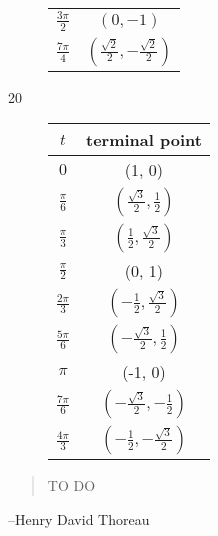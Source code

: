 \documentclass{exam}
\begin{document}
\begin{description}
\begin{tabular}{cc}
          $\frac{3 \pi}{2}$ & $\left( 0, -1 \right)$ \\
          $\frac{7 \pi}{4}$ & $\left( \frac{\sqrt{2}}{2}, -\frac{\sqrt{2}}{2} \right)$ \\
          \bottomrule
        \end{tabular}

      \item[20]
        \begin{tabular}{cc}
          \toprule
          $t$ & terminal point \\
          \midrule
          $0$ & (1, 0) \\
          $\frac{\pi}{6}$ & $\left( \frac{\sqrt{3}}{2}, \frac{1}{2} \right)$ \\
          $\frac{\pi}{3}$ & $\left( \frac{1}{2}, \frac{\sqrt{3}}{2} \right)$ \\

          \midrule
          $\frac{\pi}{2}$ & (0, 1) \\
          $\frac{2 \pi}{3}$ & $\left( -\frac{1}{2}, \frac{\sqrt{3}}{2} \right)$ \\
          $\frac{5 \pi}{6}$ & $\left( -\frac{\sqrt{3}}{2}, \frac{1}{2} \right)$ \\

          \midrule
          $\pi$ & (-1, 0) \\
          $\frac{7 \pi}{6}$ & $\left( -\frac{\sqrt{3}}{2}, -\frac{1}{2} \right)$ \\
          $\frac{4 \pi}{3}$ & $\left( -\frac{1}{2}, -\frac{\sqrt{3}}{2} \right)$ \\

          \bottomrule
        \end{tabular}
    \end{description}
  \else
    \vspace{1 cm}
    \begin{quote}
      \begin{em}
        TO DO
      \end{em}
    \end{quote}
    \hspace{1 cm} --Henry David Thoreau
  \fi
\end{document}
